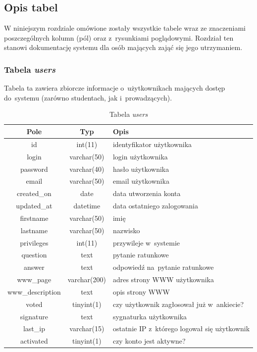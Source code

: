 \documentclass[a4paper,12pt,oneside]{report}
\begin{document}
\addtolength{\textwidth}{-4cm}
\addtolength{\hoffset}{2.5cm}
\addtolength{\textheight}{-5cm}
\addtolength{\voffset}{3.5cm}
\subsection{Opis tabel}
\label{sub:tabele}

W niniejszym rozdziale omówione zostały wszystkie tabele wraz ze znaczeniami poszczególnych kolumn (pól) oraz z~rysunkiami poglądowymi. Rozdział ten stanowi dokumentację systemu dla osób mających zająć się jego utrzymaniem.

\subsubsection{Tabela \emph{users}}
\label{subsub:users}
Tabela ta zawiera zbiorcze informacje o~użytkownikach mających dostęp do~systemu (zarówno studentach, jak i~prowadzących).

\begin{table}[h]
  \centering
  \begin{tabular}{|c|c|l|}\hline
  Pole & Typ & Opis \\\hline
  id              & int(11)      & identyfikator użytkownika \\
  login           & varchar(50)  & login użytkownika \\
  password        & varchar(40)  & hasło użytkownika \\
  email           & varchar(50)  & email użytkownika \\
  created\_on      & date         & data utworzenia konta \\
  updated\_at      & datetime     & data ostatniego zalogowania\\
  firstname       & varchar(50)  & imię \\
  lastname        & varchar(50)  & nazwisko \\
  privileges      & int(11)      & przywileje w~systemie \\
  question        & text         & pytanie ratunkowe \\
  answer          & text         & odpowiedź na~pytanie ratunkowe \\
  www\_page        & varchar(200) & adres strony WWW użytkownika\\
  www\_description & text         & opis strony WWW \\
  voted           & tinyint(1)   & czy użytkownik zagłosował już w~ankiecie? \\
  signature       & text         & sygnaturka użytkownika \\
  last\_ip         & varchar(15)  & ostatnie IP z~którego logował się użytkownik \\
  activated       & tinyint(1)   & czy konto jest aktywne? \\\hline
  \end{tabular}
  \caption{Tabela \emph{users}\label{tab:users}}
\end{table}
\end{document}
